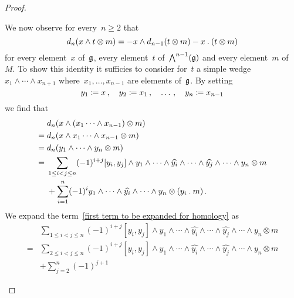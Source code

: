 \begin{proof}
\begin{enumerate}
      We now observe for every~$n \geq 2$ that
      \begin{equation}
        \label{important identity for homology}
        d_n( x \wedge t \otimes m )
        =
        - x \wedge d_{n-1}( t \otimes m)
        - x \mathbin{.} (t \otimes m)
      \end{equation}
      for every element~$x$ of~$\mathfrak{g}$, every element~$t$ of~$\operatorname{\bigwedge}^{n-1}(\mathfrak{g})$ and every element~$m$ of~$M$.
      To show this identity it sufficies to consider for~$t$ a simple wedge~$x_1 \wedge \dotsb \wedge x_{n+1}$ where~$x_1, \dotsc, x_{n-1}$ are elements of~$\mathfrak{g}$.
      By setting
      \[
        y_1 \coloneqq x \,,
        \quad
        y_2 \coloneqq x_1 \,,
        \quad
        \dotsc \,,
        \quad
        y_n \coloneqq x_{n-1}
      \]
      we find that
      \begin{align}
        {}&
        d_n( x \wedge (x_1 \dotsb \wedge x_{n-1}) \otimes m )
        \notag
        \\
        ={}&
        d_n ( x \wedge x_1 \dotsb \wedge x_{n-1} \otimes m )
        \notag
        \\
        ={}&
        d_n ( y_1 \wedge \dotsb \wedge y_n \otimes m )
        \notag
        \\
        ={}&
        \sum_{1 \leq i < j \leq n}
        (-1)^{i + j}
        [y_i, y_j] \wedge y_1 \wedge \dotsb \wedge \widehat{y_i} \wedge \dotsb \wedge \widehat{y_j} \wedge \dotsb \wedge y_n
        \otimes m
        \label{first term to be expanded for homology}
        \\
        {}&
        +
        \sum_{i=1}^n
        (-1)^i
        y_1 \wedge \dotsb \wedge \widehat{y_i} \wedge \dotsb \wedge y_n \otimes (y_i \mathbin{.} m) \,.
        \label{second term to be expanded for homology}
      \end{align}
      We expand the term~\eqref{first term to be expanded for homology} as
      \begin{align*}
        {}&
        \sum_{1 \leq i < j \leq n}
        (-1)^{i + j}
        [y_i, y_j] \wedge y_1 \wedge \dotsb \wedge \widehat{y_i} \wedge \dotsb \wedge \widehat{y_j} \wedge \dotsb \wedge y_n
        \otimes m
        \\
        ={}&
        \sum_{2 \leq i < j \leq n}
        (-1)^{i + j}
        [y_i, y_j] \wedge y_1 \wedge \dotsb \wedge \widehat{y_i} \wedge \dotsb \wedge \widehat{y_j} \wedge \dotsb \wedge y_n
        \otimes m
        \\
        {}&
        +
        \sum_{j=2}^n
        (-1)^{j+1}

\end{align*}
\end{enumerate}
\end{proof}

